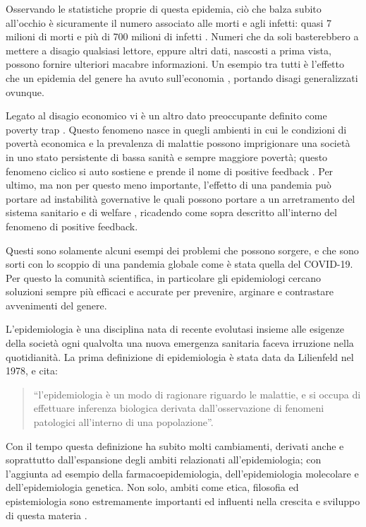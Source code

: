 Osservando le statistiche proprie di questa epidemia, 
ciò che balza subito all’occhio è sicuramente il numero 
associato alle morti e agli infetti: quasi 7 milioni di 
morti e più di 700 milioni di infetti \cite{world_health_organization}. 
Numeri che da soli basterebbero a mettere a disagio 
qualsiasi lettore, eppure altri dati, nascosti a prima 
vista, possono fornire ulteriori macabre informazioni. 
Un esempio tra tutti è l’effetto che un epidemia del 
genere ha avuto sull’economia \cite{world_bank_group_2023}, 
portando disagi generalizzati ovunque. 

Legato al disagio economico vi è un altro dato preoccupante 
definito come poverty trap \cite{Bonds2009-sg} \cite{wiki:Cycle_of_poverty}. 
Questo fenomeno nasce in quegli ambienti in cui le 
condizioni di povertà economica e la prevalenza di malattie 
possono imprigionare una società in uno stato persistente 
di bassa sanità e sempre maggiore povertà; 
questo fenomeno ciclico si auto sostiene e prende il nome 
di positive feedback \cite{wiki:Positive_feedback}. 
Per ultimo, ma non per questo meno importante, l’effetto di 
una pandemia può portare ad instabilità governative le 
quali possono portare a un arretramento del sistema 
sanitario e di welfare \cite{https://doi.org/10.1002/epa2.1152}, 
ricadendo come sopra descritto all’interno del fenomeno di positive feedback.

Questi sono solamente alcuni esempi dei problemi che 
possono sorgere, e che sono sorti con lo scoppio di una 
pandemia globale come è stata quella del COVID-19. 
Per questo la comunità scientifica, in particolare gli 
epidemiologi cercano soluzioni sempre più efficaci e 
accurate per prevenire, arginare e contrastare avvenimenti 
del genere.

L’epidemiologia è una disciplina nata di recente 
evolutasi insieme alle esigenze della società ogni 
qualvolta una nuova emergenza sanitaria faceva irruzione 
nella quotidianità. La prima definizione di epidemiologia 
è stata data da Lilienfeld \cite{10.1371/journal.pone.0208442} 
nel 1978, e cita: 

\begin{quotation}
    “l’epidemiologia è un modo di ragionare riguardo le 
    malattie, e si occupa di effettuare inferenza biologica 
    derivata dall’osservazione di fenomeni patologici 
    all’interno di una popolazione”.
\end{quotation}

Con il tempo questa definizione ha subito molti cambiamenti, 
derivati anche e soprattutto dall’espansione degli ambiti 
relazionati all’epidemiologia; con l’aggiunta ad esempio 
della farmacoepidemiologia, dell’epidemiologia molecolare 
e dell’epidemiologia genetica. Non solo, ambiti come etica, 
filosofia ed epistemiologia sono estremamente importanti 
ed influenti nella crescita e sviluppo di questa materia \cite{10.1371/journal.pone.0208442}. 

